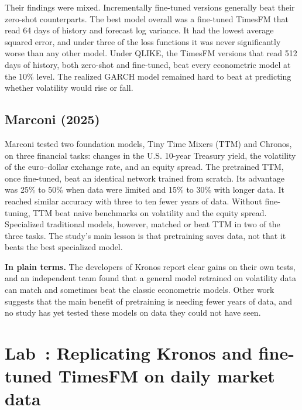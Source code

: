Their findings were mixed. Incrementally fine-tuned versions generally beat their zero-shot counterparts. The best model overall was a fine-tuned TimesFM that read 64 days of history and forecast log variance. It had the lowest average squared error, and under three of the loss functions it was never significantly worse than any other model. Under QLIKE, the TimesFM versions that read 512 days of history, both zero-shot and fine-tuned, beat every econometric model at the 10\% level. The realized GARCH model remained hard to beat at predicting whether volatility would rise or fall.

\subsection{Marconi (2025)}

Marconi tested two foundation models, Tiny Time Mixers (TTM) and Chronos, on three financial tasks: changes in the U.S. 10-year Treasury yield, the volatility of the euro--dollar exchange rate, and an equity spread. The pretrained TTM, once fine-tuned, beat an identical network trained from scratch. Its advantage was 25\% to 50\% when data were limited and 15\% to 30\% with longer data. It reached similar accuracy with three to ten fewer years of data. Without fine-tuning, TTM beat naive benchmarks on volatility and the equity spread. Specialized traditional models, however, matched or beat TTM in two of the three tasks. The study's main lesson is that pretraining saves data, not that it beats the best specialized model.

\noindent\textbf{In plain terms.} The developers of Kronos report clear gains on their own tests, and an independent team found that a general model retrained on volatility data can match and sometimes beat the classic econometric models. Other work suggests that the main benefit of pretraining is needing fewer years of data, and no study has yet tested these models on data they could not have seen.

\section{Lab~\thechapter: Replicating Kronos and fine-tuned TimesFM on daily market data}
\label{sec:23-lab}

